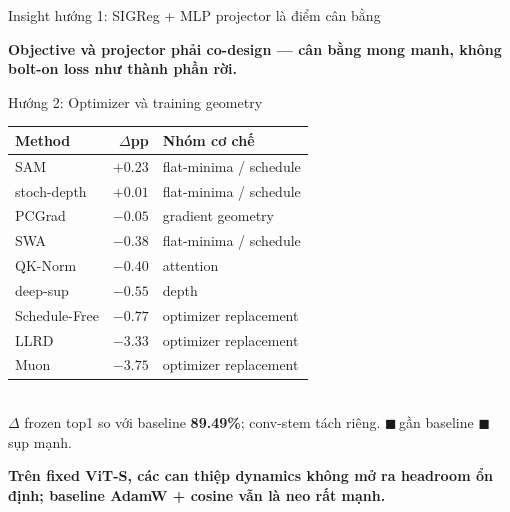 \documentclass[aspectratio=169,9pt]{beamer}
\newcommand{\takeaway}[1]{%
  \vfill
  \begin{mdframed}[
    linecolor=maccent, linewidth=1.5pt,
    backgroundcolor=mlightgold,
    innertopmargin=5pt, innerbottommargin=5pt,
    innerleftmargin=10pt, innerrightmargin=10pt,
    roundcorner=3pt, skipabove=4pt, skipbelow=0pt
  ]
  \centering\small\bfseries\color{mprimary} #1
  \end{mdframed}%
}
\begin{document}
\begin{frame}{Insight hướng 1: SIGReg + MLP projector là điểm cân bằng}
\takeaway{Objective và projector phải co-design — cân bằng mong manh, không bolt-on loss như thành phần rời.}

\end{frame}


\begin{frame}{Hướng 2: Optimizer và training geometry}

\vfill
\begin{center}
\small
\renewcommand{\arraystretch}{1.28}
\begin{tabular}{@{}l r l@{}}
\toprule
\textbf{Method} & \textbf{$\Delta$pp} & \textbf{Nhóm cơ chế} \\
\midrule
\rowcolor{mgood!24} SAM           & $+0.23$ & flat-minima / schedule \\
\rowcolor{mgood!13} stoch-depth   & $+0.01$ & flat-minima / schedule \\
\rowcolor{mgood!5}  PCGrad        & $-0.05$ & gradient geometry \\
\rowcolor{mbad!5}   SWA           & $-0.38$ & flat-minima / schedule \\
\rowcolor{mbad!8}   QK-Norm       & $-0.40$ & attention \\
\rowcolor{mbad!11}  deep-sup      & $-0.55$ & depth \\
\rowcolor{mbad!15}  Schedule-Free & $-0.77$ & optimizer replacement \\
\rowcolor{mbad!27}  LLRD          & $-3.33$ & optimizer replacement \\
\rowcolor{mbad!35}  Muon          & $-3.75$ & optimizer replacement \\
\bottomrule
\end{tabular}\\[0.4em]
{\scriptsize\color{mgray} $\Delta$ frozen top1 so với baseline \textbf{89.49\%}; conv-stem tách riêng. \; \textcolor{mgood!60!black}{$\blacksquare$}\,gần baseline \; \textcolor{mbad!60!black}{$\blacksquare$}\,sụp mạnh.}
\end{center}
\vfill

\takeaway{Trên fixed ViT-S, các can thiệp dynamics không mở ra headroom ổn định; baseline AdamW + cosine vẫn là neo rất mạnh.}

\end{frame}
\end{document}
